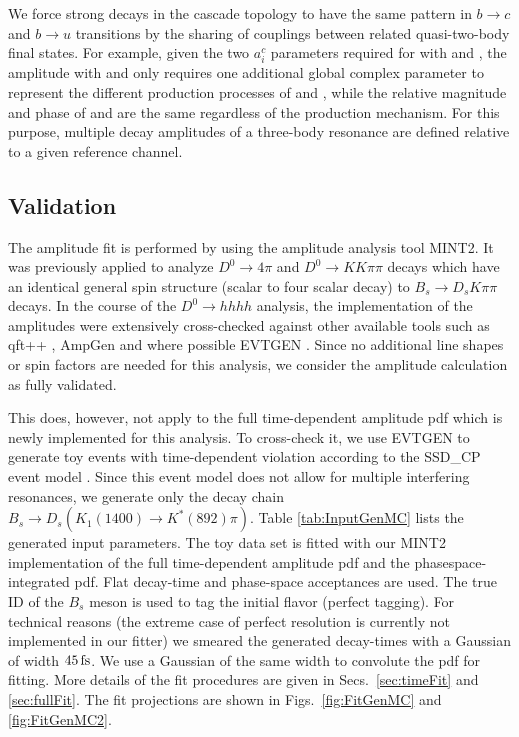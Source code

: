 We force strong decays in the cascade topology to have the same pattern in $b \to c$ and $b \to u$ transitions by the sharing of couplings between related
quasi-two-body final states. 
For example, given the two $a_i^c$ parameters required for
 with 
and , 
the amplitude  with  and
 only requires one additional global
complex parameter to represent the different production processes of
 and ,
while the relative magnitude and phase of  and  are the same regardless of the production mechanism. 
For this purpose, multiple decay amplitudes of a three-body resonance are defined relative to a given reference channel.

\clearpage
\subsection{Validation}
\label{sec:validation}

The amplitude fit is performed by using the amplitude analysis tool \textsf{MINT2}.
It was previously applied to analyze $D^0 \to 4 \pi$ and $D^0 \to KK\pi\pi$ decays \cite{dArgent:2017gzv}
which have an identical general spin structure (\ie scalar to four scalar decay) to $B_s \to D_s K \pi\pi$ decays. 
In the course of the $D^0 \to hhhh$ analysis, the implementation of the amplitudes were extensively cross-checked against 
other available tools such as \textsf{qft++} \cite{Williams:2008wu}, \textsf{AmpGen} \cite{Aaij:2017kbo} and where possible \textsf{EVTGEN} \cite{Lange:2001uf}.
Since no additional line shapes or spin factors are needed for this analysis, we consider the amplitude calculation as fully validated.

This does, however, not apply to the full time-dependent amplitude pdf which is newly implemented for this analysis.
To cross-check it, we use \textsf{EVTGEN} to generate toy events with time-dependent \CP violation according to the \textsf{SSD\_CP} event model \cite{Lange:2001uf}.
Since this event model does not allow for multiple interfering resonances, we generate only the decay chain 
$B_s \to D_s \left( K_1(1400) \to K^{*}(892) \pi \right)$. Table \ref{tab:InputGenMC}  lists the generated input parameters.
The toy data set is fitted with our \textsf{MINT2} implementation of the full time-dependent amplitude pdf and the phasespace-integrated pdf.
Flat decay-time and phase-space acceptances are used. The true ID of the $B_s$ meson is used to tag the initial flavor (\ie perfect tagging). 
For technical reasons (the extreme case of perfect resolution is currently not implemented in our fitter) we smeared the generated decay-times with a Gaussian of width $45 \mathrm{ \,fs}$. 
We use a Gaussian of the same width to convolute the pdf for fitting. More details of the fit procedures are given in Secs.~\ref{sec:timeFit} and \ref{sec:fullFit}.
The fit projections are shown in Figs.~\ref{fig:FitGenMC} and \ref{fig:FitGenMC2}.

